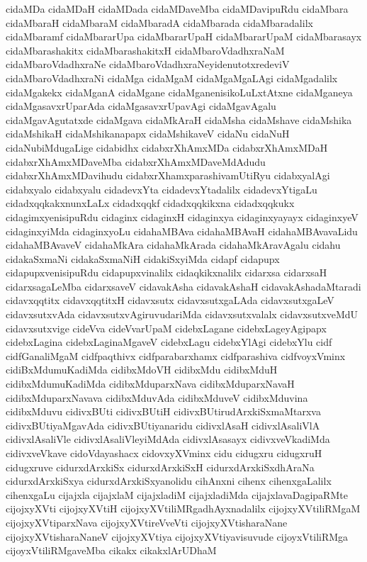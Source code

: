 {cidaMDa
cidaMDaH
cidaMDada
cidaMDaveMba
cidaMDavipuRdu
cidaMbara
cidaMbaraH
cidaMbaraM
cidaMbaradA
cidaMbarada
cidaMbaradalilx
cidaMbaramf
cidaMbararUpa
cidaMbararUpaH
cidaMbararUpaM
cidaMbarasayx
cidaMbarashakitx
cidaMbarashakitxH
cidaMbaroVdadhxraNaM
cidaMbaroVdadhxraNe
cidaMbaroVdadhxraNeyidenutotxredeviV
cidaMbaroVdadhxraNi
cidaMga
cidaMgaM
cidaMgaMgaLAgi
cidaMgadalilx
cidaMgakekx
cidaMganA
cidaMgane
cidaMganenisikoLuLxtAtxne
cidaMganeya
cidaMgasavxrUparAda
cidaMgasavxrUpavAgi
cidaMgavAgalu
cidaMgavAgutatxde
cidaMgava
cidaMkAraH
cidaMsha
cidaMshave
cidaMshika
cidaMshikaH
cidaMshikanapapx
cidaMshikaveV
cidaNu
cidaNuH
cidaNubiMdugaLige
cidabidhx
cidabxrXhAmxMDa
cidabxrXhAmxMDaH
cidabxrXhAmxMDaveMba
cidabxrXhAmxMDaveMdAdudu
cidabxrXhAmxMDavihudu
cidabxrXhamxparashivamUtiRyu
cidabxyalAgi
cidabxyalo
cidabxyalu
cidadevxYta
cidadevxYtadalilx
cidadevxYtigaLu
cidadxqqkakxnunxLaLx
cidadxqqkf
cidadxqqkikxna
cidadxqqkukx
cidagimxyenisipuRdu
cidaginx
cidaginxH
cidaginxya
cidaginxyayayx
cidaginxyeV
cidaginxyiMda
cidaginxyoLu
cidahaMBAva
cidahaMBAvaH
cidahaMBAvavaLidu
cidahaMBAvaveV
cidahaMkAra
cidahaMkArada
cidahaMkAravAgalu
cidahu
cidakaSxmaNi
cidakaSxmaNiH
cidakiSxyiMda
cidapf
cidapupx
cidapupxvenisipuRdu
cidapupxvinalilx
cidaqkikxnalilx
cidarxsa
cidarxsaH
cidarxsagaLeMba
cidarxsaveV
cidavakAsha
cidavakAshaH
cidavakAshadaMtaradi
cidavxqqtitx
cidavxqqtitxH
cidavxsutx
cidavxsutxgaLAda
cidavxsutxgaLeV
cidavxsutxvAda
cidavxsutxvAgiruvudariMda
cidavxsutxvalalx
cidavxsutxveMdU
cidavxsutxvige
cideVva
cideVvarUpaM
cidebxLagane
cidebxLageyAgipapx
cidebxLagina
cidebxLaginaMgaveV
cidebxLagu
cidebxYlAgi
cidebxYlu
cidf
cidfGanaliMgaM
cidfpaqthivx
cidfparabarxhamx
cidfparashiva
cidfvoyxVminx
cidiBxMdumuKadiMda
cidibxMdoVH
cidibxMdu
cidibxMduH
cidibxMdumuKadiMda
cidibxMduparxNava
cidibxMduparxNavaH
cidibxMduparxNavava
cidibxMduvAda
cidibxMduveV
cidibxMduvina
cidibxMduvu
cidivxBUti
cidivxBUtiH
cidivxBUtirudArxkiSxmaMtarxva
cidivxBUtiyaMgavAda
cidivxBUtiyanaridu
cidivxlAsaH
cidivxlAsaliVlA
cidivxlAsaliVle
cidivxlAsaliVleyiMdAda
cidivxlAsasayx
cidivxveVkadiMda
cidivxveVkave
cidoVdayashacx
cidovxyXVminx
cidu
cidugxru
cidugxruH
cidugxruve
cidurxdArxkiSx
cidurxdArxkiSxH
cidurxdArxkiSxdhAraNa
cidurxdArxkiSxya
cidurxdArxkiSxyanolidu
cihAnxni
cihenx
cihenxgaLalilx
cihenxgaLu
cijajxla
cijajxlaM
cijajxladiM
cijajxladiMda
cijajxlavaDagipaRMte
cijojxyXVti
cijojxyXVtiH
cijojxyXVtiliMRgadhAyxnadalilx
cijojxyXVtiliRMgaM
cijojxyXVtiparxNava
cijojxyXVtireVveVti
cijojxyXVtisharaNane
cijojxyXVtisharaNaneV
cijojxyXVtiya
cijojxyXVtiyavisuvude
cijoyxVtiliRMga
cijoyxVtiliRMgaveMba
cikakx
cikakxlArUDhaM
}
